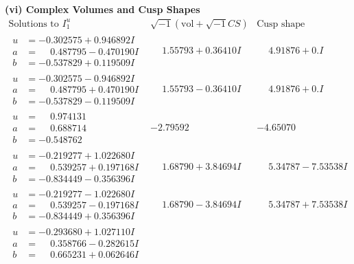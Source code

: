 \documentclass[1p]{elsarticle_modified}
\theoremstyle{definition}
\newcommand{\I}{\sqrt{-1}}
\begin{document}
\newpage\flushleft \textbf{(vi) Complex Volumes and Cusp Shapes}
$$\begin{array}{c|c|c}  
\text{Solutions to }I^u_{1}& \I (\text{vol} + \sqrt{-1}CS) & \text{Cusp shape}\\
 \hline 
\begin{aligned}
u &= -0.302575 + 0.946892 I \\
a &= \phantom{-}0.487795 - 0.470190 I \\
b &= -0.537829 + 0.119509 I\end{aligned}
 & \phantom{-}1.55793 + 0.36410 I & \phantom{-}4.91876 + 0. I\phantom{ +0.000000I} \\ \hline\begin{aligned}
u &= -0.302575 - 0.946892 I \\
a &= \phantom{-}0.487795 + 0.470190 I \\
b &= -0.537829 - 0.119509 I\end{aligned}
 & \phantom{-}1.55793 - 0.36410 I & \phantom{-}4.91876 + 0. I\phantom{ +0.000000I} \\ \hline\begin{aligned}
u &= \phantom{-}0.974131\phantom{ +0.000000I} \\
a &= \phantom{-}0.688714\phantom{ +0.000000I} \\
b &= -0.548762\phantom{ +0.000000I}\end{aligned}
 & -2.79592\phantom{ +0.000000I} & -4.65070\phantom{ +0.000000I} \\ \hline\begin{aligned}
u &= -0.219277 + 1.022680 I \\
a &= \phantom{-}0.539257 + 0.197168 I \\
b &= -0.834449 - 0.356396 I\end{aligned}
 & \phantom{-}1.68790 + 3.84694 I & \phantom{-}5.34787 - 7.53538 I \\ \hline\begin{aligned}
u &= -0.219277 - 1.022680 I \\
a &= \phantom{-}0.539257 - 0.197168 I \\
b &= -0.834449 + 0.356396 I\end{aligned}
 & \phantom{-}1.68790 - 3.84694 I & \phantom{-}5.34787 + 7.53538 I \\ \hline\begin{aligned}
u &= -0.293680 + 1.027110 I \\
a &= \phantom{-}0.358766 - 0.282615 I \\
b &= \phantom{-}0.665231 + 0.062646 I\end{aligned}

\end{array}$$
\end{document}
